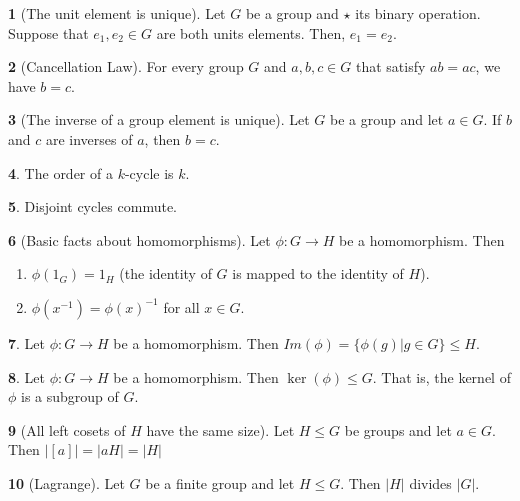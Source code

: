 \documentclass[12pt]{article}
\theoremstyle{definition}
\newtheorem{theorem}{\color{ForestGreen}{\textbf{Theorem}}}
\begin{document}
\begin{theorem}[The unit element is unique]
Let $G$ be a group and $\star$ its binary operation. Suppose that $e_1, e_2 \in G$ are both units elements. Then, $e_1 = e_2$.
\end{theorem}

\begin{theorem}[Cancellation Law]
For every group $G$ and $a,b,c \in G$ that satisfy $ab = ac$, we have $b=c$.
\end{theorem}

\begin{theorem}[The inverse of a group element is unique]
Let $G$ be a group and let $a \in G$. If $b$ and $c$ are inverses of $a$, then $b = c$.
\end{theorem}

\begin{theorem}
The order of a $k$-cycle is $k$.
\end{theorem}

\begin{theorem}
Disjoint cycles commute.
\end{theorem}

\begin{theorem}[Basic facts about homomorphisms]
Let $\phi : G \to H$ be a homomorphism. Then
\begin{enumerate}
\item $\phi(1_G) = 1_H$ (the identity of $G$ is mapped to the identity of $H$).
\item $\phi(x^{-1}) = \phi(x)^{-1}$ for all $x \in G$.
\end{enumerate}
\end{theorem}

\begin{theorem}
Let $\phi : G \to H$ be a homomorphism. Then $Im(\phi) = \{ \phi(g) | g \in G \} \leq H$.
\end{theorem}

\begin{theorem}
Let $\phi: G \to H$ be a homomorphism. Then $\ker(\phi) \leq G$. That is, the kernel of $\phi$ is a subgroup of $G$.
\end{theorem}

\begin{theorem}[All left cosets of $H$ have the same size]
Let $H \leq G$ be groups and let $a \in G$. Then $|[a] | = |aH| = |H|$
\end{theorem}

\begin{theorem}[Lagrange]
Let $G$ be a finite group and let $H \leq G$. Then $|H|$ divides $|G|$.
\end{theorem}
\end{document}
